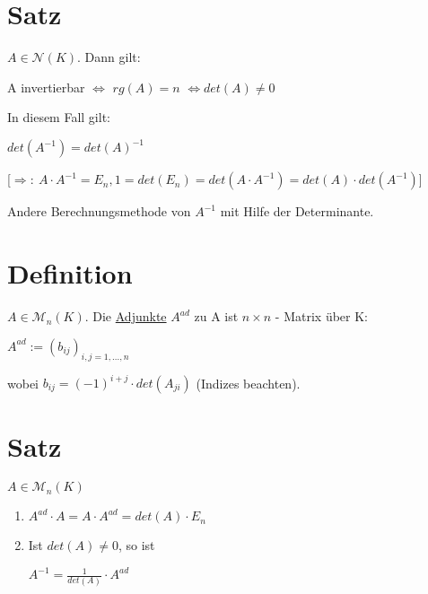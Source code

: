 \documentclass[a4paper, openany]{book}
\begin{document}
        \section{Satz}

        $A \in \mathcal{N}(K)$. Dann gilt:

        \begin{center}
          A invertierbar $\Leftrightarrow$ $rg(A) = n$ $\Leftrightarrow det(A) \neq 0$
        \end{center}

        In diesem Fall gilt:

        \begin{center}
          $det(A^{-1}) = det(A)^{-1}$
        \end{center}

        [$\Rightarrow: \ A \cdot A^{-1} = E_n, 1 = det(E_n) = det(A \cdot A^{-1}) = det(A) \cdot det(A^{-1})$]

        \par \medskip

        Andere Berechnungsmethode von $A^{-1}$ mit Hilfe der Determinante.

        \section{Definition}

        $A \in \mathcal{M}_n(K)$. Die \underline{Adjunkte} $A^{ad}$ zu A ist $n \times n$ - Matrix über K:

        \begin{center}
          $A^{ad} := (b_{ij})_{i,j=1,...,n}$
        \end{center}

        wobei $b_{ij} = (-1)^{i+j} \cdot det(A_{ji})$ (Indizes beachten).

        \section{Satz}

        $A \in \mathcal{M}_n(K)$

        \begin{enumerate}[label=(\alph*)]
          \item $A^{ad} \cdot A = A \cdot A^{ad} = det(A) \cdot E_n$

          \item Ist $det(A) \neq 0$, so ist

          \begin{center}
            $A^{-1} = \frac{1}{det(A)} \cdot A^{ad}$
          \end{center}
        \end{enumerate}
\end{document}
